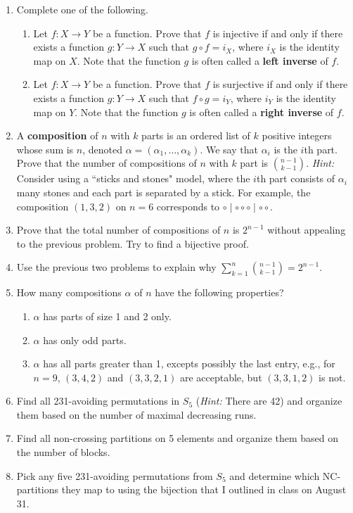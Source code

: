 \documentclass[11pt]{article}%
\theoremstyle{definition}
\begin{document}
\begin{enumerate}

\item Complete one of the following.
\begin{enumerate}
\item Let $f:X\to Y$ be a function.  Prove that $f$ is injective if and only if there exists a function $g:Y\to X$ such that $g\circ f=i_X$, where $i_X$ is the identity map on $X$. Note that the function $g$ is often called a \textbf{left inverse} of $f$.
\item Let $f:X\to Y$ be a function.  Prove that $f$ is surjective if and only if there exists a function $g:Y\to X$ such that $f\circ g=i_Y$, where $i_Y$ is the identity map on $Y$. Note that the function $g$ is often called a \textbf{right inverse} of $f$.
\end{enumerate}
\item A \textbf{composition} of $n$ with $k$ parts is an ordered list of $k$ positive integers whose sum is $n$, denoted $\alpha=(\alpha_1,\ldots,\alpha_k)$.  We say that $\alpha_i$ is the $i$th part.  Prove that the number of compositions of $n$ with $k$ part is $\binom{n-1}{k-1}$.  \emph{Hint:} Consider using a ``sticks and stones" model, where the $i$th part consists of $\alpha_i$ many stones and each part is separated by a stick. For example, the composition $(1,3,2)$ on $n=6$ corresponds to $\circ \mid \circ \circ \circ \mid \circ \circ$.
\item Prove that the total number of compositions of $n$ is $2^{n-1}$ without appealing to the previous problem. Try to find a bijective proof.
\item Use the previous two problems to explain why $\sum_{k=1}^n\binom{n-1}{k-1}=2^{n-1}$.
\item\label{nugget} How many compositions $\alpha$ of $n$ have the following properties?
\begin{enumerate}
\item $\alpha$ has parts of size 1 and 2 only.
\item $\alpha$ has only odd parts.
\item $\alpha$ has all parts greater than 1, excepts possibly the last entry, e.g., for $n=9$, $(3,4,2)$ and $(3,3,2,1)$ are acceptable, but $(3,3,1,2)$ is not.
\end{enumerate}
\item Find all 231-avoiding permutations in $S_5$ (\emph{Hint:} There are 42) and organize them based on the number of maximal decreasing runs.
\item Find all non-crossing partitions on 5 elements and organize them based on the number of blocks.
\item Pick any five 231-avoiding permutations from $S_5$ and determine which NC-partitions they map to using the bijection that I outlined in class on August 31.
\end{enumerate}
\end{document}
